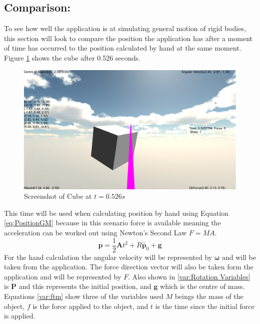 \subsection{Comparison:}\label{sc:Comp}
To see how well the application is at simulating general motion of rigid bodies, this section will look to compare the position the application has after a moment of time has occurred to the position calculated by hand at the same moment.
Figure \ref{fig:ScreenShotSingle} shows the cube after 0.526 seconds.
\begin{figure}[h!]
	\centering
	\includegraphics[width=\textwidth]{images/Screenshot2.PNG}
	\caption{Screenshot of Cube at $t = 0.526 s$}
	\label{fig:ScreenShotSingle}
\end{figure}
This time will be used when calculating position by hand using Equation \ref{eq:PositionGM} because in this scenario force is available meaning the acceleration can be worked out using Newton's Second Law $F=MA$.
\begin{equation}\label{eq:PositionGM}
\mathbf{p}=\frac{1}{2}\mathbf{A}t^{2}+{R}\tilde{\mathbf{p}_{0}}+\mathbf{g}
\end{equation}
For the hand calculation the angular velocity will be represented by $\boldsymbol{\omega}$ and will be taken from the application.
The force direction vector will also be taken form the application and will be represented by $F$.
Also shown in \ref{var:Rotation Variables} is $\mathbf{P}$ and this represents the initial position, and $\mathbf{g}$ which is the centre of mass.
Equations \ref{var:ftm} show three of the variables used $M$ beings the mass of the object, $f$ is the force applied to the object, and $t$ is the time since the initial force is applied. 
